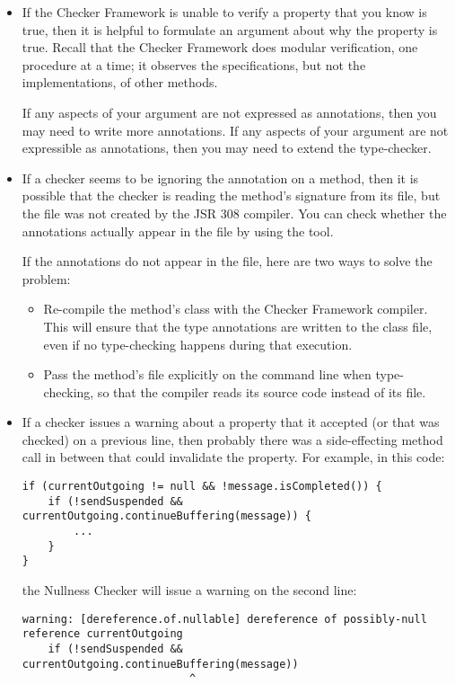 \begin{itemize}
\item
  If the Checker Framework is unable to verify a property that you know is
  true, then it is helpful to formulate an argument about why the property
  is true.  Recall that the Checker Framework does modular verification,
  one procedure at a time; it observes the specifications, but not the
  implementations, of other methods.

  If any aspects of your argument are not expressed as annotations, then
  you may need to write more annotations.  If any aspects of your argument
  are not expressible as annotations, then you may need to extend the
  type-checker.

\item
If a checker seems to be ignoring the annotation on a method, then it is
possible that the checker is reading the method's signature from its
 file, but the  file was not created by the JSR
308 compiler.  You can check whether the annotations actually appear in the
 file by using the  tool.

If the annotations do not appear in the  file, here are two
ways to solve the problem:
\begin{itemize}
\item
  Re-compile the method's class with the Checker Framework compiler.  This will
  ensure that the type annotations are written to the class file, even if
  no type-checking happens during that execution.
\item
  Pass the method's file explicitly on the command line when type-checking,
  so that the compiler reads its source code instead of its 
  file.
\end{itemize}

\item
If a checker issues a warning about a property that it accepted (or that
was checked) on a previous line, then probably there was a side-effecting
method call in between that could invalidate the property.  For example, in
this code:

\begin{Verbatim}
if (currentOutgoing != null && !message.isCompleted()) {
    if (!sendSuspended && currentOutgoing.continueBuffering(message)) {
        ...
    }
}
\end{Verbatim}

\noindent
the Nullness Checker will issue a warning on the second line:
\begin{Verbatim}
warning: [dereference.of.nullable] dereference of possibly-null reference currentOutgoing
    if (!sendSuspended && currentOutgoing.continueBuffering(message))
                          ^
\end{Verbatim}


\end{itemize}
